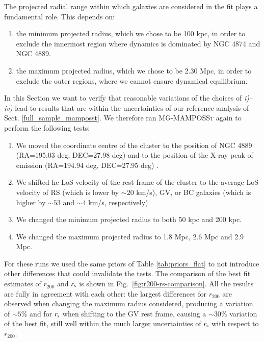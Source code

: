 \documentclass{aa}
\begin{document}
The projected radial range within which galaxies are considered in the fit plays a fundamental role. This depends on:

\begin{enumerate}
    \item[\textit{iii)}] the minimum projected radius, which we chose to be 100 kpc, in order to exclude the innermost region where dynamics is dominated by NGC 4874 and NGC 4889.
    
    \item[\textit{iv)}] the maximum projected radius, which we chose to be 2.30 Mpc, in order to exclude the outer regions, where we cannot ensure dynamical equilibrium. 
    
\end{enumerate} 
In this Section we want to verify that reasonable variations of the choices of \textit{i)--iv)} lead to results that are within the uncertainties of our reference analysis of Sect. \ref{full_sample_mamposst}. We therefore ran \textsc{MG-MAMPOSSt} again to perform the following tests:

\begin{enumerate}

    \item[\textit{i)}] We moved the coordinate centre of the cluster to the position of NGC 4889 (RA=195.03 deg, DEC=27.98 deg) and to the position of the X-ray peak of emission (RA=194.94 deg, DEC=27.95 deg) \citep{Sato_2011}.
    
    \item[\textit{ii)}] We shifted he LoS velocity of the rest frame of the cluster to the average LoS velocity of RS (which is lower by $\sim 20$ km/s), GV, or BC galaxies (which is higher by $\sim 53$ and $\sim 4$ km/s, respectively). 

    \item[\textit{iii)}] We changed the minimum projected radius to both 50 kpc and 200 kpc.
    
    \item[\textit{iv)}] We changed the maximum projected radius to 1.8 Mpc, 2.6 Mpc and 2.9 Mpc.
    
\end{enumerate} 
For these runs we used the same priors of Table \ref{tab:priors_flat} to not introduce other differences that could invalidate the tests. The comparison of the best fit estimates of $r_{200}$ and $r_{\rm s}$ is shown in Fig.~\ref{fig:r200-rs-comparison}. All the results are fully in agreement with each other: the largest differences for $r_{200}$ are observed when changing the maximum radius considered, producing a variation of $\sim 5\%$ and for $r_{\rm s}$ when shifting to the GV rest frame, causing a $\sim 30\%$ variation of the best fit, still well within the much larger uncertainties of $r_{\rm s}$ with respect to $r_{200}$.
\end{document}
